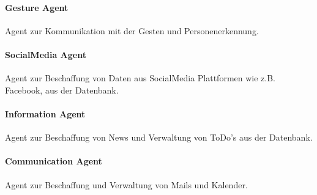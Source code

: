 \documentclass[10pt,a4paper]{report}
\begin{document}
        \paragraph{Gesture Agent}
            Agent zur Kommunikation mit der Gesten und Personenerkennung.
        \paragraph{SocialMedia Agent}
            Agent zur Beschaffung von Daten aus
            SocialMedia Plattformen wie z.B. Facebook, aus der Datenbank.
        \paragraph{Information Agent}
            Agent zur Beschaffung von News und Verwaltung
            von ToDo's aus der Datenbank.
        \paragraph{Communication Agent}
            Agent zur Beschaffung und Verwaltung von
            Mails und Kalender.
\end{document}
